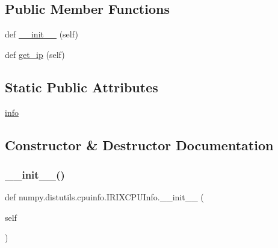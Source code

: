 \subsection*{Public Member Functions}
\begin{DoxyCompactItemize}
\item 
def \hyperlink{classnumpy_1_1distutils_1_1cpuinfo_1_1IRIXCPUInfo_a596ae9817eaf30a88c96afc4c7c0e874}{\+\_\+\+\_\+init\+\_\+\+\_\+} (self)
\item 
def \hyperlink{classnumpy_1_1distutils_1_1cpuinfo_1_1IRIXCPUInfo_a2c5115a65414097d89bd0da9e7bbab1d}{get\+\_\+ip} (self)
\end{DoxyCompactItemize}
\subsection*{Static Public Attributes}
\begin{DoxyCompactItemize}
\item 
\hyperlink{classnumpy_1_1distutils_1_1cpuinfo_1_1IRIXCPUInfo_accff99b43a8c65bc3911a1cee126bdbe}{info}
\end{DoxyCompactItemize}


\subsection{Constructor \& Destructor Documentation}
\mbox{\label{classnumpy_1_1distutils_1_1cpuinfo_1_1IRIXCPUInfo_a596ae9817eaf30a88c96afc4c7c0e874}} 
\subsubsection{\texorpdfstring{\+\_\+\+\_\+init\+\_\+\+\_\+()}{\_\_init\_\_()}}
{\footnotesize\ttfamily def numpy.\+distutils.\+cpuinfo.\+I\+R\+I\+X\+C\+P\+U\+Info.\+\_\+\+\_\+init\+\_\+\+\_\+ (\begin{DoxyParamCaption}\item[{}]{self }\end{DoxyParamCaption})}



